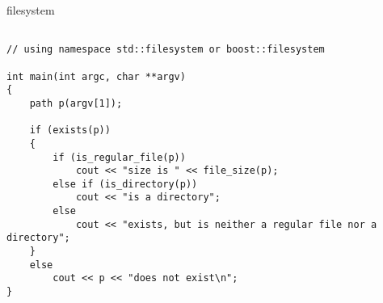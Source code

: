 \documentclass{beamer}
\begin{document}
\begin{frame}[fragile]{filesystem}
\begin{lstlisting}

// using namespace std::filesystem or boost::filesystem

int main(int argc, char **argv)
{
    path p(argv[1]);

    if (exists(p)) 
    {
        if (is_regular_file(p))
            cout << "size is " << file_size(p);
        else if (is_directory(p))
            cout << "is a directory";
        else
            cout << "exists, but is neither a regular file nor a directory";
    }
    else
        cout << p << "does not exist\n";
}
\end{lstlisting}
\end{frame}
\end{document}
